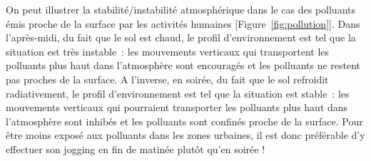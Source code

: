 \sk
On peut illustrer la stabilité/instabilité atmosphérique dans le cas des polluants émis proche de la surface par les activités humaines [Figure~\ref{fig:pollution}]. Dans l'après-midi, du fait que le sol est chaud, le profil d'environnement est tel que la situation est très instable~: les mouvements verticaux qui transportent les polluants plus haut dans l'atmosphère sont encouragés et les polluants ne restent pas proches de la surface. A l'inverse, en soirée, du fait que le sol refroidit radiativement, le profil d'environnement est tel que la situation est stable~: les mouvements verticaux qui pourraient transporter les polluants plus haut dans l'atmosphère sont inhibés et les polluants sont confinés proche de la surface. Pour être moins exposé aux polluants dans les zones urbaines, il est donc préférable d'y effectuer son jogging en fin de matinée plutôt qu'en soirée !

